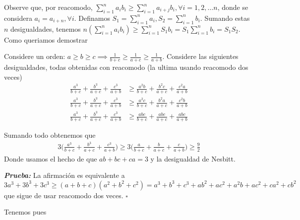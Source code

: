 \begin{sol}
	Observe que, por reacomodo, $\sum_{i=1}^{n} a_{i}b_{i} \geq \sum_{i=1}^{n} a_{i+j}b_{i}, \forall i = 1, 2, \dots n$, donde se considera $a_{i} = a_{i+n}, \forall i$. Definamos $S_{1} = \sum_{i=1}^{n} a_{i}, S_{2} = \sum_{i=1}^{n} b_{i}$. Sumando estas $n$ desigualdades, tenemos
	$n(\sum_{i=1}^{n} a_{i}b_{i}) \geq \sum_{i=1}^{n} S_{1}b_{i} = S_{1}\sum_{i=1}^{n} b_{i} = S_{1}S_{2}$. Como queriamos demostrar
\end{sol}

\begin{sol}
	Considere un orden: $a \geq b \geq c\implies \frac{1}{b+c} \geq \frac{1}{a+c} \geq \frac{1}{a+b} $. Considere las siguientes desigualdades, todas obtenidas con reacomodo (la ultima usando reacomodo dos veces)
	\begin{align}
	\frac{a^3}{b+c}+\frac{b^3}{a+c} + \frac{c^3}{a+b} & \geq \frac{a^2b}{b+c}+\frac{b^2c}{a+c} + \frac{c^2a}{a+b}\\
	\frac{a^3}{b+c}+\frac{b^3}{a+c} + \frac{c^3}{a+b} & \geq \frac{a^2c}{b+c}+\frac{b^2a}{a+c} + \frac{c^2b}{a+b}\\
	\frac{a^3}{b+c}+\frac{b^3}{a+c} + \frac{c^3}{a+b} & \geq \frac{abc}{b+c}+\frac{abc}{a+c} + \frac{abc}{a+b}
	\end{align}
	
	Sumando todo obtenemos que 
	\begin{align}
	3\bigg(\frac{a^3}{b+c}+\frac{b^3}{a+c} + \frac{c^3}{a+b}\bigg) \geq 3 \bigg(\frac{a}{b+c}+\frac{b}{a+c} + \frac{c}{a+b}\bigg) \geq \frac{9}{2}
	\end{align}
	Donde usamos el hecho de que $ab+bc+ca = 3 $ y la desigualdad de Nesbitt.
\end{sol}

\begin{sol}
	\begin{lem}
		
	\end{lem}
	\textbf{\textit{Prueba:}} La afirmaci\'on es equivalente a $3a^3+3b^3+3c^3 \geq (a+b+c)(a^2+b^2+c^2) = a^3+b^3+c^3+ab^2+ac^2+a^2b+ac^2+ca^2+cb^2$ que sigue de usar reacomodo dos veces. $\square$
	
	Tenemos pues 

\end{sol}

